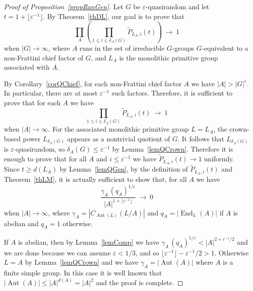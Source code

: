 \documentclass[10pt,a4paper]{amsart}
\newcommand{\Aut}{\mathop{\mathrm{Aut}}}
\newcommand{\End}{\mathop{\mathrm{End}}}
\begin{document}
\begin{proof}[Proof of Proposition~\ref{propRanGen}] 
Let $G$ be $\varepsilon$-quasirandom and let $t= 1+ \lfloor \varepsilon^{-1} \rfloor$.
By Theorem~\ref{thDL}, our goal is to prove that 
$$ \prod_{A} \left( \prod_{1 \leq i \leq \delta_A(G)} \widetilde{P}_{L_A,i}(t) \right) 
\> \to \> 1 $$
when $|G| \to \infty$,
where $A$ runs in the set of irreducible $G$-groups $G$-equivalent to a non-Frattini
chief factor of $G$,
and $L_A$ is the monolithic primitive group associated with $A$.

By Corollary~\ref{corQChief}, for each non-Frattini chief factor $A$ we have $|A| > |G|^\varepsilon$.
In particular, there are at most $\varepsilon^{-1}$ such factors.
Therefore, it is sufficient to prove that for each $A$ we have
$$ \prod_{1 \leq i \leq \delta_A(G)} \widetilde{P}_{L_A,i}(t)  \> \to \> 1 $$
when $|A| \to \infty$.
For the associated monolithic primitive group $L=L_A$,
the crown-based power $L_{\delta_A(G)}$ appears as a nontrivial quotient of $G$.
It follows that $L_{\delta_A(G)}$ is $\varepsilon$-quasirandom,
so $\delta_A(G) \leq \varepsilon^{-1}$ by Lemma~\ref{lemQCrown}.
Therefore it is enough to prove that for all $A$ and $i \leq \varepsilon^{-1}$
we have $\widetilde{P}_{L_A,i}(t)  \to 1$ uniformly.
Since $t \geq d(L_A)$ by Lemma~\ref{lemQGen},
by the definition of $\widetilde{P}_{L_A,i}(t)$ and Theorem~\ref{thLM},
it is actually sufficient to show that, for all $A$ we have
$$ \frac{\gamma_A \, (q_A)^{1/\varepsilon}}{|A|^{1+ \lfloor \varepsilon^{-1} \rfloor}} \> \to \> 0 $$
when $|A| \to \infty$,
where $\gamma_A = |C_{\Aut(L)}(L/A)|$ and $q_A = |\End_L(A)|$ if $A$ is abelian and $q_A =1$ otherwise.

If $A$ is abelian, then by Lemma~\ref{lemComp} we have
$\gamma_A \, (q_A)^{1/\varepsilon} < |A|^{2+\varepsilon^{-1}/2}$
and we are done because we can assume $\varepsilon < 1/3$,
and so $\lfloor \varepsilon^{-1} \rfloor - \varepsilon^{-1}/2 >1$.
Otherwise $L=A$ by Lemma~\ref{lemQCrown} and we have $\gamma_A =|\Aut(A)|$ where $A$ is a finite simple group.
In this case it is well known that $|\Aut(A)| \leq |A|^{d(A)} = |A|^2$ and the proof is complete.
\end{proof}
\end{document}

